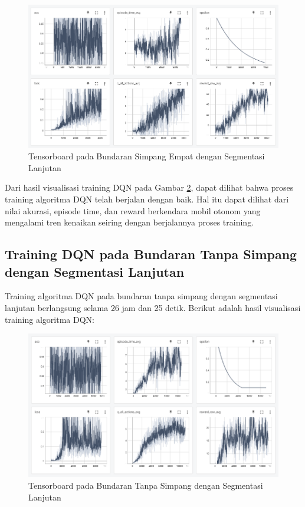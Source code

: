 \begin{figure}[H] 
	\centering
	\includegraphics[width=1\linewidth]{images/tensorboard_bunderan_segmented}
	\caption{Tensorboard pada Bundaran Simpang Empat dengan Segmentasi Lanjutan}
	\label{fig:tensorboard_bundaran_simpangempat_segmentasi_lanjutan}
\end{figure}

Dari hasil visualisasi training DQN pada Gambar \ref{fig:tensorboard_bundaran_tanpasimpang_segmentasi_lanjutan}, dapat dilihat bahwa proses training algoritma DQN telah berjalan dengan baik. Hal itu dapat dilihat dari nilai akurasi, episode time, dan reward berkendara mobil otonom yang mengalami tren kenaikan seiring dengan berjalannya proses training.


\subsection{Training DQN pada Bundaran Tanpa Simpang dengan Segmentasi Lanjutan}
\label{sec:training_dqn_bundaran_nosimpang_segmentasi_hitam_putih}

Training algoritma DQN pada bundaran tanpa simpang dengan segmentasi lanjutan berlangsung selama 26 jam dan 25 detik. Berikut adalah hasil visualisasi training algoritma DQN:

\begin{figure}[H] 
	\centering
	\includegraphics[width=1\linewidth]{images/tensorboard_itemputih_nosimpang}
	\caption{Tensorboard pada Bundaran Tanpa Simpang dengan Segmentasi Lanjutan}
	\label{fig:tensorboard_bundaran_tanpasimpang_segmentasi_lanjutan}
\end{figure}

